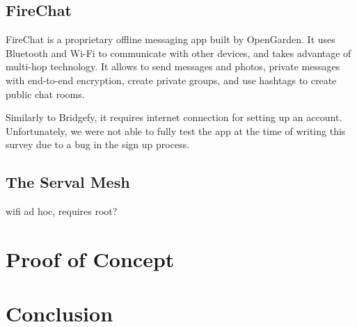 \documentclass[conference,compsoc]{IEEEtran}
\begin{document}
\subsection{FireChat}
FireChat is a proprietary offline messaging app built by OpenGarden. It uses Bluetooth and Wi-Fi to communicate with other devices, and takes advantage of multi-hop technology. It allows to send messages and photos, private messages with end-to-end encryption, create private groups, and use hashtags to create public chat rooms. \cite{firechat}

Similarly to Bridgefy, it requires internet connection for setting up an account. Unfortunately, we were not able to fully test the app at the time of writing this survey due to a bug in the sign up process.

\subsection{The Serval Mesh}
wifi ad hoc, requires root?


\section{Proof of Concept} \label{poc}
\section{Conclusion} \label{conclusion}



\end{document}

